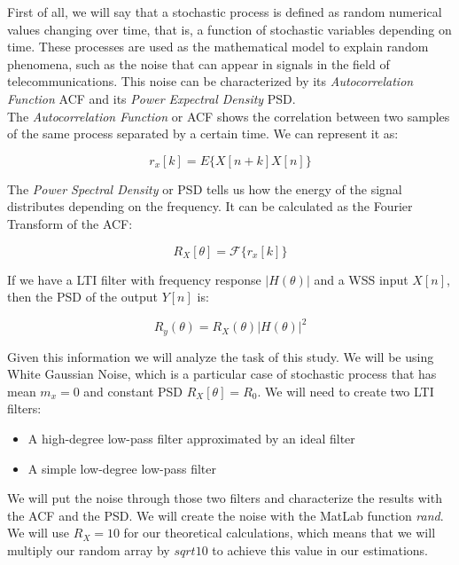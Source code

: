 \documentclass[a4paper,11pt]{article}
\begin{document}
First of all, we will say that a stochastic process is defined as random
numerical values changing over time, that is, a function of stochastic
variables depending on time. These processes are used as the mathematical model
to explain random phenomena, such as the noise that can appear in signals in
the field of telecommunications. This noise can be characterized by its
\textit{Autocorrelation Function} ACF and its \textit{Power Expectral Density}
PSD. \\

The \textit{Autocorrelation Function} or ACF shows the correlation between two
samples of the same process separated by a certain time. We can represent it as:

\begin{equation}\label{eq:ACF}
   r_x[k] = E\{X[n+k]X[n]\}
\end{equation}

The \textit{Power Spectral Density} or PSD tells us how the energy of the
signal distributes depending on the frequency. It can be calculated as the
Fourier Transform of the ACF:

\begin{equation}\label{eq:PSD}
   R_X[\theta] = \mathcal{F}\{r_x[k]\}
\end{equation}

If we have a LTI filter with frequency response $|H(\theta)|$ and a WSS input
$X[n]$, then the PSD of the output $Y[n]$ is: \

\begin{equation}\label{eq:LTI}
   R_y(\theta) = R_X(\theta) |H(\theta)|^2
\end{equation}

Given this information we will analyze the task of this study. We will be
using White Gaussian Noise, which is a particular case of stochastic process
that has mean $m_x = 0$ and constant PSD $R_X[\theta] = R_0$.
We will need to create two LTI filters:

\begin{itemize}
  \item A high-degree low-pass filter approximated by an ideal filter
  \item A simple low-degree low-pass filter
\end{itemize}

We will put the noise through those two filters and characterize the
results with the ACF and the PSD. We will create the noise with the MatLab
function \textit{rand}. We will use $R_X=10$ for our theoretical calculations,
which means that we will multiply our random array by $sqrt{10}$ to achieve
this value in our estimations.
\end{document}
